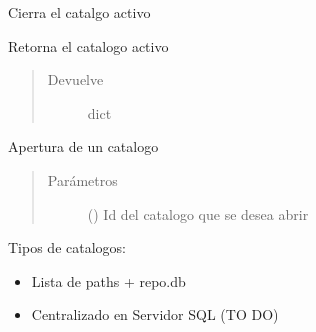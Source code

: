 \documentclass[a4paper,12pt,spanish]{sphinxmanual}
\begin{document}
\begin{fulllineitems}
\begin{fulllineitems}
\label{\detokenize{openerm.OermClient:openerm.OermClient.OermClient.close_catalog}}
Cierra el catalgo activo

\end{fulllineitems}


\begin{fulllineitems}
\label{\detokenize{openerm.OermClient:openerm.OermClient.OermClient.current_catalog}}
Retorna el catalogo activo
\begin{quote}\begin{description}
\item[{Devuelve}] \leavevmode
dict

\end{description}\end{quote}

\end{fulllineitems}


\begin{fulllineitems}
\label{\detokenize{openerm.OermClient:openerm.OermClient.OermClient.open_catalog}}
Apertura de un catalogo
\begin{quote}\begin{description}
\item[{Parámetros}] \leavevmode
{} () \textendash{} Id del catalogo que se desea abrir

\end{description}\end{quote}

Tipos de catalogos:
\begin{itemize}
\item {} 
Lista de paths + repo.db

\item {} 
Centralizado en Servidor SQL (TO DO)


\end{itemize}
\end{fulllineitems}
\end{fulllineitems}
\end{document}
